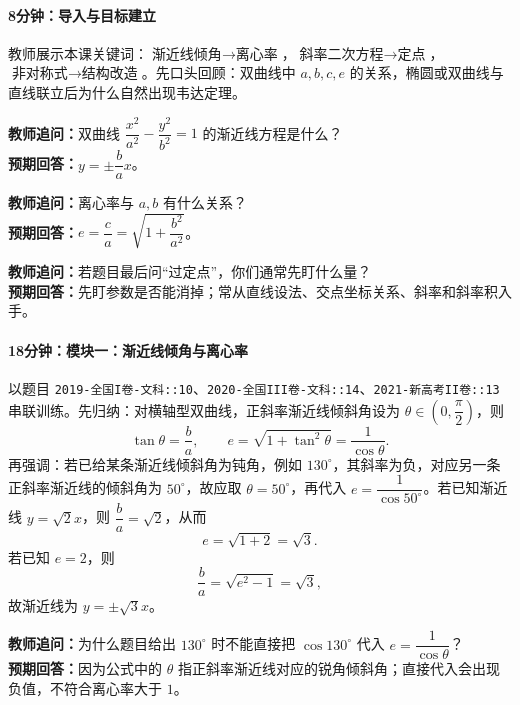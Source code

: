 \documentclass[UTF8,a4paper,11pt]{ctexart}
\begin{document}
\paragraph{8分钟：导入与目标建立}

教师展示本课关键词：$\text{渐近线倾角}\to\text{离心率}$，$\text{斜率二次方程}\to\text{定点}$，$\text{非对称式}\to\text{结构改造}$。先口头回顾：双曲线中 $a,b,c,e$ 的关系，椭圆或双曲线与直线联立后为什么自然出现韦达定理。

\noindent\textbf{教师追问：}双曲线 $\dfrac{x^2}{a^2}-\dfrac{y^2}{b^2}=1$ 的渐近线方程是什么？\\

\textbf{预期回答：}$y=\pm\dfrac{b}{a}x$。\par

\noindent\textbf{教师追问：}离心率与 $a,b$ 有什么关系？\\

\textbf{预期回答：}$e=\dfrac{c}{a}=\sqrt{1+\dfrac{b^2}{a^2}}$。\par

\noindent\textbf{教师追问：}若题目最后问“过定点”，你们通常先盯什么量？\\

\textbf{预期回答：}先盯参数是否能消掉；常从直线设法、交点坐标关系、斜率和斜率积入手。\par

\paragraph{18分钟：模块一：渐近线倾角与离心率}

以题目 \texttt{2019-全国I卷-文科::10}、\texttt{2020-全国III卷-文科::14}、\texttt{2021-新高考II卷::13} 串联训练。先归纳：对横轴型双曲线，正斜率渐近线倾斜角设为 $\theta\in\left(0,\dfrac{\pi}{2}\right)$，则
\[
\tan\theta=\frac{b}{a},\qquad e=\sqrt{1+\tan^2\theta}=\frac{1}{\cos\theta}.
\]
再强调：若已给某条渐近线倾斜角为钝角，例如 $130^\circ$，其斜率为负，对应另一条正斜率渐近线的倾斜角为 $50^\circ$，故应取 $\theta=50^\circ$，再代入 $e=\dfrac{1}{\cos50^\circ}$。若已知渐近线 $y=\sqrt2x$，则 $\dfrac{b}{a}=\sqrt2$，从而
\[
e=\sqrt{1+2}=\sqrt3.
\]
若已知 $e=2$，则
\[
\frac{b}{a}=\sqrt{e^2-1}=\sqrt3,
\]
故渐近线为 $y=\pm\sqrt3x$。

\noindent\textbf{教师追问：}为什么题目给出 $130^\circ$ 时不能直接把 $\cos130^\circ$ 代入 $e=\dfrac{1}{\cos\theta}$？\\

\textbf{预期回答：}因为公式中的 $\theta$ 指正斜率渐近线对应的锐角倾斜角；直接代入会出现负值，不符合离心率大于 $1$。\par
\end{document}
